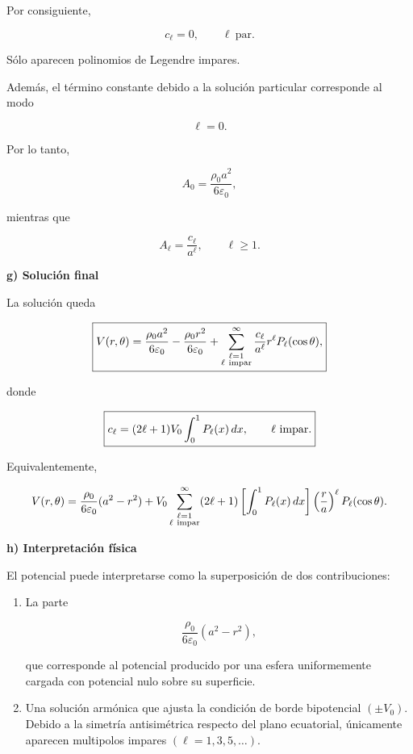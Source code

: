 \documentclass[11pt,spanish]{article}
\begin{document}
Por consiguiente,

\[
\boxed{
c_\ell=0,
\qquad
\ell\ \text{par}.
}
\]

Sólo aparecen polinomios de Legendre impares.

Además, el término constante debido a la solución particular corresponde al modo

\[
\ell=0.
\]

Por lo tanto,

\[
A_0
=
\frac{\rho_0a^2}{6\varepsilon_0},
\]

mientras que

\[
A_\ell
=
\frac{c_\ell}{a^\ell},
\qquad
\ell\ge1.
\]


{\bf g) Solución final}

La solución queda

\[
\boxed{
V(r,\theta)
=
\frac{\rho_0a^2}{6\varepsilon_0}
-
\frac{\rho_0r^2}{6\varepsilon_0}
+
\sum_{\substack{\ell=1\\ \ell\ {\rm impar}}}^{\infty}
\frac{c_\ell}{a^\ell}
r^\ell
P_\ell(\cos\theta),
}
\]

donde

\[
\boxed{
c_\ell
=
(2\ell+1)V_0
\int_0^1
P_\ell(x)\,dx,
\qquad
\ell\ {\rm impar}.
}
\]

Equivalentemente,

\[
V(r,\theta)
=
\frac{\rho_0}{6\varepsilon_0}(a^2-r^2)
+
V_0
\sum_{\substack{\ell=1\\ \ell\ {\rm impar}}}^{\infty}
(2\ell+1)
\left[
\int_0^1P_\ell(x)\,dx
\right]
\left(\frac{r}{a}\right)^\ell
P_\ell(\cos\theta).
\]


{\bf h) Interpretación física}

El potencial puede interpretarse como la superposición de dos contribuciones:

\begin{enumerate}
\item La parte

\[
\frac{\rho_0}{6\varepsilon_0}(a^2-r^2),
\]

que corresponde al potencial producido por una esfera uniformemente cargada con
potencial nulo sobre su superficie.

\item Una solución armónica que ajusta la condición de borde bipotencial
\((\pm V_0)\). Debido a la simetría antisimétrica respecto del plano
ecuatorial, únicamente aparecen multipolos impares
\((\ell=1,3,5,\ldots)\).
\end{enumerate}
\end{document}
